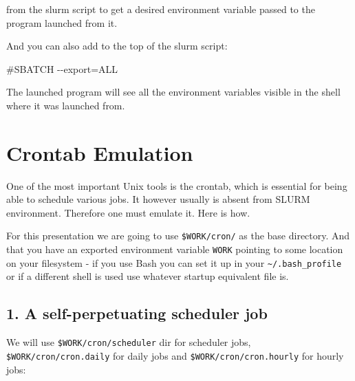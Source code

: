 \documentclass[
]{report}
\newenvironment{Shaded}{\begin{snugshade}}{\end{snugshade}}
\newcommand{\AttributeTok}[1]{\textcolor[rgb]{0.40,0.45,0.13}{#1}}
\newcommand{\CommentTok}[1]{\textcolor[rgb]{0.37,0.37,0.37}{#1}}
\newcommand{\ExtensionTok}[1]{\textcolor[rgb]{0.00,0.23,0.31}{#1}}
\newcommand{\NormalTok}[1]{\textcolor[rgb]{0.00,0.23,0.31}{#1}}
\newcommand{\VariableTok}[1]{\textcolor[rgb]{0.07,0.07,0.07}{#1}}
\begin{document}
from the slurm script to get a desired environment variable passed to
the program launched from it.

And you can also add to the top of the slurm script:

\begin{Shaded}
\begin{Highlighting}[]
\CommentTok{\#SBATCH {-}{-}export=ALL}
\end{Highlighting}
\end{Shaded}

The launched program will see all the environment variables visible in
the shell where it was launched from.

\section{Crontab Emulation}\label{crontab-emulation}

One of the most important Unix tools is the crontab, which is essential
for being able to schedule various jobs. It however usually is absent
from SLURM environment. Therefore one must emulate it. Here is how.

For this presentation we are going to use \texttt{\$WORK/cron/} as the
base directory. And that you have an exported environment variable
\texttt{WORK} pointing to some location on your filesystem - if you use
Bash you can set it up in your \texttt{\textasciitilde{}/.bash\_profile}
or if a different shell is used use whatever startup equivalent file is.

\subsection{1. A self-perpetuating scheduler
job}\label{a-self-perpetuating-scheduler-job}

We will use \texttt{\$WORK/cron/scheduler} dir for scheduler jobs,
\texttt{\$WORK/cron/cron.daily} for daily jobs and
\texttt{\$WORK/cron/cron.hourly} for hourly jobs:

\begin{Shaded}
\end{Shaded}
\end{document}
